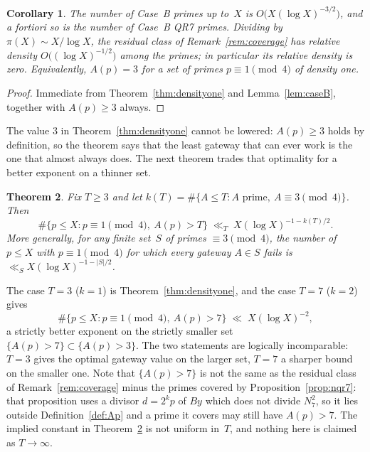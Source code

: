 \documentclass[12pt]{amsart}
\newtheorem{theorem}{Theorem}[section]
\newtheorem{corollary}[theorem]{Corollary}
\theoremstyle{definition}
\theoremstyle{remark}
\begin{document}
\begin{corollary}\label{cor:caseB}
The number of Case~B primes up to~$X$ is $O\bigl(X(\log X)^{-3/2}\bigr)$,
and a fortiori so is the number of Case~B QR7 primes.  Dividing by
$\pi(X) \sim X/\log X$, the residual class of
Remark~\ref{rem:coverage} has relative density
$O\bigl((\log X)^{-1/2}\bigr)$ among the primes; in particular its
relative density is zero.  Equivalently, $A(p) = 3$ for a set of primes
$p \equiv 1 \pmod 4$ of density one.
\end{corollary}

\begin{proof}
Immediate from Theorem~\ref{thm:densityone} and
Lemma~\ref{lem:caseB}, together with $A(p) \geq 3$ always.
\end{proof}

The value $3$ in Theorem~\ref{thm:densityone} cannot be lowered:
$A(p) \geq 3$ holds by definition, so the theorem says that the least
gateway that can ever work is the one that almost always does.  The
next theorem trades that optimality for a better exponent on a thinner
set.

\begin{theorem}\label{thm:generalT}
Fix $T \geq 3$ and let $k(T) = \#\{A \leq T : A \text{ prime},\
A \equiv 3 \pmod 4\}$.  Then
\[
  \#\{p \leq X : p \equiv 1 \!\!\pmod 4,\ A(p) > T\}
  \;\ll_T\; X (\log X)^{-1-k(T)/2}.
\]
More generally, for any finite set~$S$ of primes $\equiv 3 \pmod 4$,
the number of $p \leq X$ with $p \equiv 1 \pmod 4$ for which every
gateway $A \in S$ fails is $\ll_S X(\log X)^{-1-|S|/2}$.
\end{theorem}

The case $T = 3$ ($k = 1$) is Theorem~\ref{thm:densityone}, and the
case $T = 7$ ($k = 2$) gives
\[
  \#\{p \leq X : p \equiv 1 \!\!\pmod 4,\ A(p) > 7\}
  \;\ll\; X (\log X)^{-2},
\]
a strictly better exponent on the strictly smaller set
$\{A(p) > 7\} \subset \{A(p) > 3\}$.  The two statements are
logically incomparable: $T = 3$ gives the optimal gateway value on the
larger set, $T = 7$ a sharper bound on the smaller one.
Note that $\{A(p) > 7\}$ is not the same as the residual class of
Remark~\ref{rem:coverage} minus the primes covered by
Proposition~\ref{prop:nqr7}: that proposition uses a divisor
$d = 2^k p$ of $B y$ which does not divide $N_7^2$, so it lies outside
Definition~\ref{def:Ap} and a prime it covers may still have
$A(p) > 7$.  The implied constant in Theorem~\ref{thm:generalT} is not
uniform in~$T$, and nothing here is claimed as $T \to \infty$.
\end{document}
